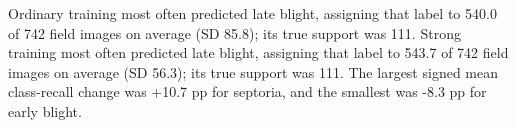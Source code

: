 Ordinary training most often predicted late blight, assigning that label to 540.0 of 742 field images on average (SD 85.8); its true support was 111. Strong training most often predicted late blight, assigning that label to 543.7 of 742 field images on average (SD 56.3); its true support was 111. The largest signed mean class-recall change was +10.7 pp for septoria, and the smallest was -8.3 pp for early blight.
